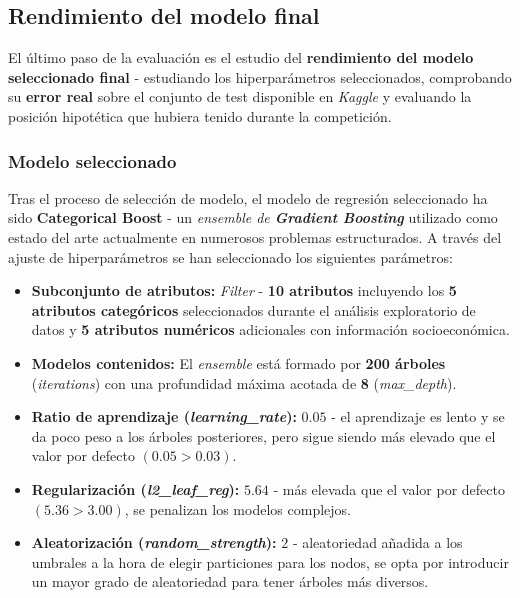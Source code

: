 \subsection{Rendimiento del modelo final}

El último paso de la evaluación es el estudio del \textbf{rendimiento del modelo seleccionado final} - estudiando los hiperparámetros seleccionados, comprobando su \textbf{error real} sobre el conjunto de test disponible en \textit{Kaggle} y evaluando la posición hipotética que hubiera tenido durante la competición.

\subsubsection{Modelo seleccionado}

Tras el proceso de selección de modelo, el modelo de regresión seleccionado ha sido \textbf{Categorical Boost} - un \textit{ensemble de \textbf{Gradient Boosting}} utilizado como estado del arte actualmente en numerosos problemas estructurados. A través del ajuste de hiperparámetros se han seleccionado los siguientes parámetros:

\begin{itemize}[parsep=1pt, itemsep=2pt, topsep=1pt]
	\item \textbf{Subconjunto de atributos:} \textit{Filter} - \textbf{10 atributos} incluyendo los \textbf{5 atributos categóricos} seleccionados durante el análisis exploratorio de datos y \textbf{5 atributos numéricos} adicionales con información socioeconómica.
	\item \textbf{Modelos contenidos:} El \textit{ensemble} está formado por \textbf{200 árboles} (\textit{iterations}) con una profundidad máxima acotada de \textbf{8} (\textit{max\_depth}).
	\item \textbf{Ratio de aprendizaje (\textit{learning\_rate}):} $0.05$ - el aprendizaje es lento y se da poco peso a los árboles posteriores, pero sigue siendo más elevado que el valor por defecto $(0.05 > 0.03)$.
	\item \textbf{Regularización (\textit{l2\_leaf\_reg}):} $5.64$ - más elevada que el valor por defecto $(5.36>3.00)$, se penalizan los modelos complejos.
	\item \textbf{Aleatorización (\textit{random\_strength}):} $2$ - aleatoriedad añadida a los umbrales a la hora de elegir particiones para los nodos, se opta por introducir un mayor grado de aleatoriedad para tener árboles más diversos.
\end{itemize}


